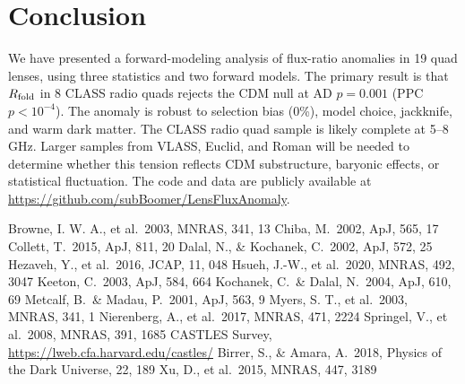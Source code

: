 \documentclass[12pt]{article}
\newcommand{\rfold}{\ensuremath{R_{\rm fold}}}
\begin{document}
\section{Conclusion}
\label{sec:conclusion}

We have presented a forward-modeling analysis of flux-ratio anomalies
in 19 quad lenses, using three statistics and two forward models.
The primary result is that \rfold{} in 8 CLASS radio quads rejects
the CDM null at AD $p=0.001$ (PPC $p<10^{-4}$).
The anomaly is robust to selection bias (0\%), model choice,
jackknife, and warm dark matter.
The CLASS radio quad sample is likely complete at 5--8 GHz.
Larger samples from VLASS, Euclid, and Roman will be needed
to determine whether this tension reflects CDM substructure,
baryonic effects, or statistical fluctuation.
The code and data are publicly available at
\url{https://github.com/subBoomer/LensFluxAnomaly}.

\clearpage
\begin{thebibliography}{}
 Browne, I. W. A., et al.\ 2003,
  MNRAS, 341, 13
 Chiba, M.\ 2002, ApJ, 565, 17
 Collett, T.\ 2015, ApJ, 811, 20
 Dalal, N.,
  \& Kochanek, C.\ 2002, ApJ, 572, 25
 Hezaveh, Y., et al.\ 2016,
  JCAP, 11, 048
 Hsueh, J.-W., et al.\ 2020,
  MNRAS, 492, 3047
 Keeton, C.\ 2003, ApJ, 584, 664
 Kochanek, C.\
  \& Dalal, N.\ 2004, ApJ, 610, 69
 Metcalf, B.\
  \& Madau, P.\ 2001, ApJ, 563, 9
\bibitem[Meyers et al.(2003)]{Myers2003} Myers, S. T., et al.\ 2003,
  MNRAS, 341, 1
\bibitem[Nierenberg et al.(2017)]{Nierenberg2017} Nierenberg, A., et al.\
  2017, MNRAS, 471, 2224
 Springel, V., et al.\ 2008,
  MNRAS, 391, 1685
 CASTLES Survey,
  \url{https://lweb.cfa.harvard.edu/castles/}
 Birrer, S., \& Amara, A.\ 2018,
  Physics of the Dark Universe, 22, 189
\bibitem[Xu et al.(2015)]{Xu2015} Xu, D., et al.\ 2015, MNRAS, 447, 3189
\end{thebibliography}
\end{document}

